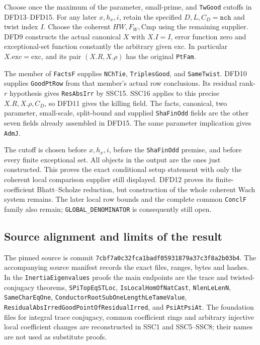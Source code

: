 \documentclass[11pt,a4paper]{article}
\numberwithin{equation}{section}
\theoremstyle{remark}\newtheorem{remark}[theorem]{Remark}
\begin{document}
Choose once the maximum of the parameter, small-prime, and
\texttt{Tw\allowbreak Good} cutoffs in DFD13--DFD15. For any later
$x,h_x,i$, retain the specified $D,L,C_D=\texttt{nch}$ and twist
index $I$. Choose the coherent $HW,F_W,\mathrm{Cmp}$ using the
remaining supplier. DFD9 constructs the actual canonical
$X$ with $X.I=I$, error function zero and exceptional-set function
constantly the arbitrary given $\mathrm{exc}$. In particular
$X.\mathrm{exc}=\mathrm{exc}$, and its pair $(X.R,X.\rho)$ has
the original \texttt{Pt\allowbreak Fam}.

The member of \texttt{Facts\allowbreak F} supplies \texttt{NCh\allowbreak Tie},
\texttt{Triples\allowbreak Good}, and \texttt{Same\allowbreak Twist}. DFD10 supplies
\texttt{Good\allowbreak Pt\allowbreak Row} from that member's actual row conclusions.
Its residual rank-$r$ hypothesis gives \texttt{Res\allowbreak Abs\allowbreak Irr} by
SSC15. SSC16 applies to this precise $X.R,X.\rho,C_D$, so DFD11
gives the killing field. The facts, canonical, two parameter,
small-scale, split-bound and supplied \texttt{Sha\allowbreak Fin\allowbreak Odd} fields
are the other seven fields already assembled in DFD15.
The same parameter implication gives \texttt{Adm\allowbreak J}.

The cutoff is chosen before $x,h_x,i$, before the
\texttt{Sha\allowbreak Fin\allowbreak Odd} premise, and before every finite exceptional
set. All objects in the output are the ones just constructed.
This proves the exact conditional setup statement with only the
coherent local comparison supplier still displayed. DFD12 proves
its finite-coefficient Bhatt--Scholze reduction, but construction
of the whole coherent Wach system remains. The later local row
bounds and the complete common \texttt{Concl\allowbreak F} family also remain;
\texttt{GLOBAL\_\allowbreak DENOMINATOR} is consequently still open.

\subsection{Source alignment and limits of the result}

The pinned source is commit
\texttt{7cbf7a0c32fca1badf05931879a37c3f8a2b03b4}.
The accompanying source manifest records the exact files, ranges,
bytes and hashes. In the \texttt{Inertia\allowbreak Eigenvalues} proofs the
main endpoints are the trace and twisted-conjugacy theorems,
\texttt{SPi\allowbreak Top\allowbreak Eq\allowbreak STLoc}, \texttt{Is\allowbreak Local\allowbreak Hom\allowbreak Of\allowbreak Nat\allowbreak Cast},
\texttt{Nlen\allowbreak Le\allowbreak Len\allowbreak N}, \texttt{Same\allowbreak Char\allowbreak Eq\allowbreak One},
\texttt{Conductor\allowbreak Root\allowbreak Sub\allowbreak One\allowbreak Length\allowbreak Le\allowbreak Tame\allowbreak Value},
\texttt{Residual\allowbreak Abs\allowbreak Irred\allowbreak Good\allowbreak Point\allowbreak Of\allowbreak Residual\allowbreak Irred}, and
\texttt{Psi\allowbreak At\allowbreak Psi\allowbreak At}. The foundation files for integral trace
conjugacy, common coefficient rings and arbitrary injective local
coefficient changes are reconstructed in SSC1 and SSC5--SSC8;
their names are not used as substitute proofs.
\end{document}
